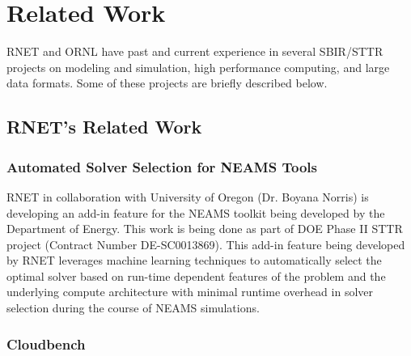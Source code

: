 
\section{Related Work}
\label{related}

RNET and ORNL have past and current experience in several SBIR/STTR projects on modeling and simulation, high performance computing, 
and large data formats. Some of these projects are briefly described below. 

\subsection{RNET's Related Work}

\subsubsection{Automated Solver Selection for NEAMS Tools}

RNET in collaboration with University of Oregon (Dr. Boyana Norris) is developing an add-in feature for the NEAMS 
toolkit being developed by the Department of Energy. This work is being done as part of DOE Phase II STTR project 
(Contract Number DE-SC0013869). This add-in feature being developed by RNET leverages machine learning techniques 
to automatically select the optimal solver based on run-time dependent features of the problem and the underlying 
compute architecture with minimal runtime overhead in solver selection during the course of NEAMS simulations. 

\subsubsection{Cloudbench} 




